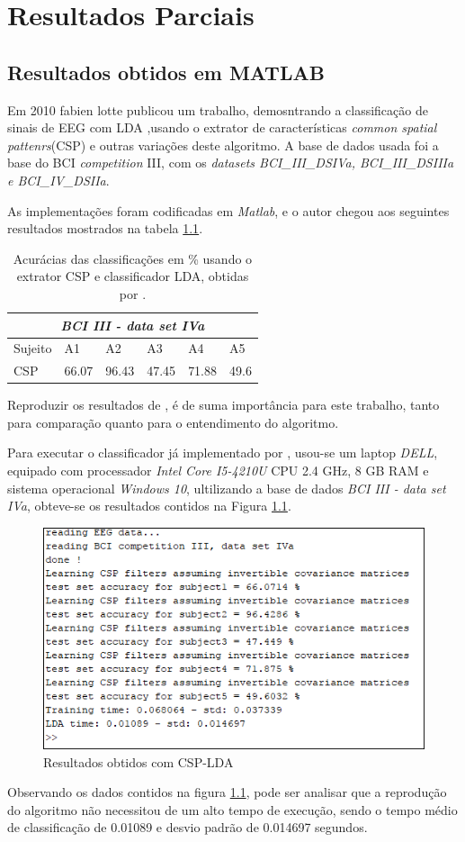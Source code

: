 \chapter[Resultados Parcias ]{Resultados Parciais}

\section{Resultados obtidos em MATLAB}
Em 2010 fabien lotte publicou um trabalho, demosntrando a classificação de sinais de EEG com LDA \cite{F.Lotte},usando o extrator de características \textit{common spatial pattenrs}(CSP) e outras
variações deste algoritmo. A base de dados usada foi a base do BCI \textit{competition} III, com os \textit{datasets BCI\_III\_DSIVa, BCI\_III\_DSIIIa e BCI\_IV\_DSIIa}. 

As implementações foram codificadas em \textit{Matlab}, e o autor chegou aos seguintes resultados mostrados na tabela \ref{resultlotte}.

\begin{table}[h]
\centering
\caption{Acurácias das classificações em \% usando o extrator CSP e classificador LDA, obtidas por \cite{F.Lotte}.}
\label{resultlotte}
\begin{tabular}{|l|l|l|l|l|l|}
\hline
\multicolumn{6}{|c|}{\textit{BCI III -  data set IVa}}  \\ \hline
Sujeito & A1    & A2    & A3    & A4    & A5   \\ \hline
CSP     & 66.07 & 96.43 & 47.45 & 71.88 & 49.6 \\ \hline
\end{tabular}
\end{table}
 
Reproduzir os resultados de \cite{F.Lotte}, é de suma importância para este trabalho, tanto para comparação quanto para o entendimento do algoritmo. 

Para executar o classificador já implementado por \cite{F.Lotte}, usou-se um laptop \textit{DELL}, equipado com processador \textit{Intel Core I5-4210U} CPU 2.4 GHz, 8 GB RAM e sistema operacional \textit{Windows 10},  ultilizando a base de dados \textit{BCI III -  data set IVa}, obteve-se os resultados contidos na Figura \ref{resultadoLotte}.

\begin{figure}[h]
	\centering
	\includegraphics[keepaspectratio=true,scale=0.9]{figuras/resultados_csp_lda.png}
	\caption{Resultados obtidos  com CSP-LDA}
	\label{resultadoLotte}
\end{figure}

Observando os dados contidos na figura \ref{resultadoLotte}, pode ser analisar que a reprodução do algoritmo não necessitou de um alto tempo de execução, sendo o tempo médio de classificação de 0.01089 e desvio padrão de 0.014697 segundos.